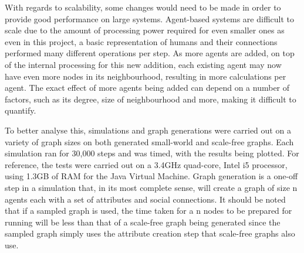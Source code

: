 \documentclass[]{report}
\begin{document}
With regards to scalability, some changes would need to be made in order to provide good performance on large systems. Agent-based systems are difficult to scale due to the amount of processing power required for even smaller ones as even in this project, a basic representation of humans and their connections performed many different operations per step. As more agents are added, on top of the internal processing for this new addition, each existing agent may now have even more nodes in its neighbourhood, resulting in more calculations per agent. The exact effect of more agents being added can depend on a number of factors, such as its degree, size of neighbourhood and more, making it difficult to quantify.

To better analyse this, simulations and graph generations were carried out on a variety of graph sizes on both generated small-world and scale-free graphs. Each simulation ran for 30,000 steps and was timed, with the results being plotted. For reference, the tests were carried out on a 3.4GHz quad-core, Intel i5 processor, using 1.3GB of RAM for the Java Virtual Machine. Graph generation is a one-off step in a simulation that, in its most complete sense, will create a graph of size n agents each with a set of attributes and social connections. It should be noted that if a sampled graph is used, the time taken for a n nodes to be prepared for running will be less than that of a scale-free graph being generated since the sampled graph simply uses the attribute creation step that scale-free graphs also use.
\end{document}
